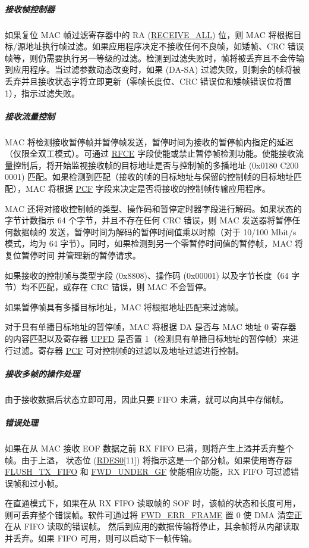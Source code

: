 \documentclass[main\_\_CN.tex]{subfiles}
\begin{document}
\subparagraph{接收帧控制器}
如果复位 MAC 帧过滤寄存器中的 RA (\hyperref[regdesc:EMACFFREG]{RECEIVE\_ALL}) 位，则 MAC 将根据目标/源地址执行帧过滤。如果应用程序决定不接收任何不良帧，如矮帧、CRC 错误帧等，则仍需要执行另一等级的过滤。检测到过滤失败时，帧将被丢弃且不会传输到应用程序。当过滤参数动态改变时，如果 (DA-SA) 过滤失败，则剩余的帧将被丢弃并且接收状态字将立即更新（零帧长度位、CRC 错误位和矮帧错误位将置 1），指示过滤失败。

\subparagraph{接收流量控制}
MAC 将检测接收暂停帧并暂停帧发送，暂停时间为接收的暂停帧内指定的延迟（仅限全双工模式）。可通过 \hyperref[regdesc:EMACFLOWCONTROLREG]{RFCE} 字段使能或禁止暂停帧检测功能。使能接收流量控制后，将开始监视接收帧的目标地址是否与控制帧的多播地址 (0x0180 C200 0001) 匹配。如果检测到匹配（接收的帧的目标地址与保留的控制帧的目标地址匹配），MAC 将根据 \hyperref[regdesc:EMACFFREG]{PCF} 字段来决定是否将接收的控制帧传输应用程序。

MAC 还将对接收控制帧的类型、操作码和暂停定时器字段进行解码。如果状态的字节计数指示 64 个字节，并且不存在任何 CRC 错误，则 MAC 发送器将暂停任何数据帧的 发送，暂停时间为解码的暂停时间值乘以时隙（对于 10/100 Mbit/s 模式，均为 64 字节）。同时，如果检测到另一个零暂停时间值的暂停帧，MAC 将复位暂停时间 并管理新的暂停请求。

如果接收的控制帧与类型字段 (0x8808)、操作码 (0x00001) 以及字节长度（64 字节）均不匹配，或存在 CRC 错误，则 MAC 不会暂停。

如果暂停帧具有多播目标地址，MAC 将根据地址匹配来过滤帧。

对于具有单播目标地址的暂停帧，MAC 将根据 DA 是否与 MAC 地址 0 寄存器的内容匹配以及寄存器 \hyperref[regdesc:EMACFLOWCONTROLREG]{UPFD} 是否置 1（检测具有单播目标地址的暂停帧）来进行过滤。寄存器 \hyperref[regdesc:EMACFFREG]{PCF} 可对控制帧的过滤以及地址过滤进行控制。

\subparagraph{接收多帧的操作处理}
由于接收数据后状态立即可用，因此只要 FIFO 未满，就可以向其中存储帧。


\subparagraph{错误处理}
如果在从 MAC 接收 EOF 数据之前 RX FIFO 已满，则将产生上溢并丢弃整个帧。由于上溢， 状态位 (\hyperref[tab:ethernetmac-RDES0]{RDES0}[11]) 将指示这是一个部分帧。如果使用寄存器 \hyperref[regdesc:DMAOPERATIONMODEREG]{FLUSH\_TX\_FIFO} 和 \hyperref[regdesc:DMAOPERATIONMODEREG]{FWD\_UNDER\_GF} 使能相应功能，RX FIFO 可过滤错误帧和过小帧。

在直通模式下，如果在从 RX FIFO 读取帧的 SOF 时，该帧的状态和长度可用，则可丢弃整个错误帧。软件可通过将 \hyperref[regdesc:DMAOPERATIONMODEREG]{FWD\_ERR\_FRAME} 置 0 使 DMA 清空正在从 FIFO 读取的错误帧。 然后到应用的数据传输将停止，其余帧将从内部读取并丢弃。如果 FIFO 可用，则可以启动下一帧传输。
\end{document}

